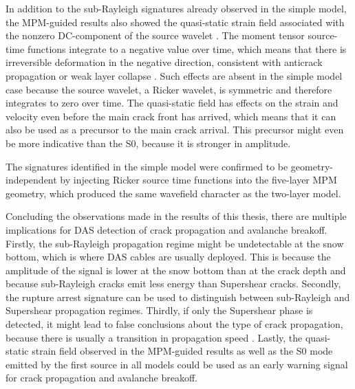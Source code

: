 In addition to the sub-Rayleigh signatures already observed in the simple model, the MPM-guided results also showed the quasi-static strain field associated with the nonzero DC-component of the source wavelet \parencite{freundDynamicFractureMechanics1998}. The moment tensor source-time functions integrate to a negative value over time, which means that there is irreversible deformation in the negative direction, consistent with anticrack propagation or weak layer collapse \parencite{heierliAnticracksNewTheory2003,heierliAnticrackNucleationTriggering2008,gaumeDynamicAnticrackPropagation2018}. Such effects are absent in the simple model case because the source wavelet, a Ricker wavelet, is symmetric and therefore integrates to zero over time. The quasi-static field has effects on the strain and velocity even before the main crack front has arrived, which means that it can also be used as a precursor to the main crack arrival. This precursor might even be more indicative than the S0, because it is stronger in amplitude. \par 

The signatures identified in the simple model were confirmed to be geometry-independent by injecting Ricker source time functions into the five-layer MPM geometry, which produced the same wavefield character as the two-layer model. \par


Concluding the observations made in the results of this thesis, there are multiple implications for DAS detection of crack propagation and avalanche breakoff. Firstly, the sub-Rayleigh propagation regime might be undetectable at the snow bottom, which is where DAS cables are usually deployed. This is because the amplitude of the signal is lower at the snow bottom than at the crack depth and because sub-Rayleigh cracks emit less energy than Supershear cracks. Secondly, the rupture arrest signature can be used to distinguish between sub-Rayleigh and Supershear propagation regimes. Thirdly, if only the Supershear phase is detected, it might lead to false conclusions about the type of crack propagation, because there is usually a transition in propagation speed \parencite{sironTheoreticalFrameworkDynamic2023,bobillierNumericalInvestigationCrack2024}. Lastly, the quasi-static strain field observed in the MPM-guided results as well as the S0 mode emitted by the first source in all models could be used as an early warning signal for crack propagation and avalanche breakoff. \par 


